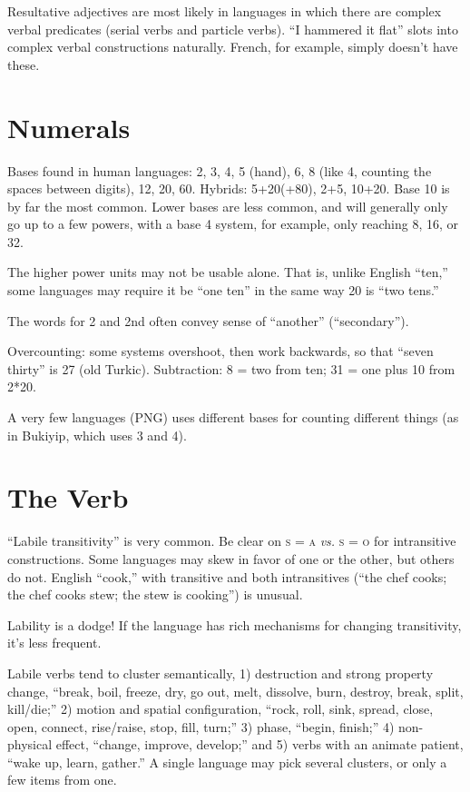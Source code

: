 \documentclass[11pt]{article}
\newcommand{\I}[1]{\textsc{#1}}   %
\begin{document}
Resultative adjectives are most likely in languages in which there are
complex verbal predicates (serial verbs and particle verbs). ``I
hammered it flat'' slots into complex verbal constructions naturally.
French, for example, simply doesn't have these.


\section{Numerals}
Bases found in human languages: 2, 3, 4, 5 (hand), 6, 8 (like 4,
counting the spaces between digits), 12, 20, 60.  Hybrids: 5+20(+80),
2+5, 10+20.  Base 10 is by far the most common.  Lower bases are less
common, and will generally only go up to a few powers, with a base 4
system, for example, only reaching 8, 16, or 32.

The higher power units may not be usable alone. That is, unlike
English ``ten,'' some languages may require it be ``one ten'' in the
same way 20 is ``two tens.''

The words for 2 and 2nd often convey sense of ``another''
(``secondary''). 

Overcounting: some systems overshoot, then work backwards, so that
``seven thirty'' is 27 (old Turkic).  Subtraction: 8 = two from ten;
31 = one plus 10 from 2*20.

A very few languages (PNG) uses different bases for counting different
things (as in Bukiyip, which uses 3 and 4).


\section{The Verb}
``Labile transitivity'' is very common.  Be clear on \I{s = a}
\textit{vs.} \I{s = o} for intransitive constructions.  Some languages
may skew in favor of one or the other, but others do not.  English
``cook,'' with transitive and both intransitives (``the chef cooks;
the chef cooks stew; the stew is cooking'') is unusual.

Lability is a dodge!  If the language has rich mechanisms for changing
transitivity, it's less frequent.

Labile verbs tend to cluster semantically, 1) destruction and strong
property change, ``break, boil, freeze, dry, go out, melt, dissolve,
burn, destroy, break, split, kill/die;'' 2) motion and spatial
configuration, ``rock, roll, sink, spread, close, open, connect,
rise/raise, stop, fill, turn;'' 3) phase, ``begin, finish;'' 4)
non-physical effect, ``change, improve, develop;'' and 5) verbs with
an animate patient, ``wake up, learn, gather.''  A single language may
pick several clusters, or only a few items from one.
\end{document}
